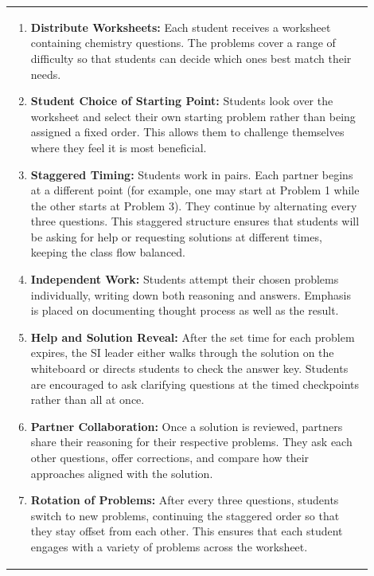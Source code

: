 \documentclass{article}
\begin{document}
\begin{tabular}{|p{0.9\linewidth}|}
\hline
\vspace{0.2cm}
\begin{enumerate}
    \item \textbf{Distribute Worksheets:} Each student receives a worksheet containing chemistry questions. The problems cover a range of difficulty so that students can decide which ones best match their needs.
    
    \item \textbf{Student Choice of Starting Point:} Students look over the worksheet and select their own starting problem rather than being assigned a fixed order. This allows them to challenge themselves where they feel it is most beneficial.
    
    \item \textbf{Staggered Timing:} Students work in pairs. Each partner begins at a different point (for example, one may start at Problem 1 while the other starts at Problem 3). They continue by alternating every three questions. This staggered structure ensures that students will be asking for help or requesting solutions at different times, keeping the class flow balanced.
    
    \item \textbf{Independent Work:} Students attempt their chosen problems individually, writing down both reasoning and answers. Emphasis is placed on documenting thought process as well as the result.
    
    \item \textbf{Help and Solution Reveal:} After the set time for each problem expires, the SI leader either walks through the solution on the whiteboard or directs students to check the answer key. Students are encouraged to ask clarifying questions at the timed checkpoints rather than all at once.
    
    \item \textbf{Partner Collaboration:} Once a solution is reviewed, partners share their reasoning for their respective problems. They ask each other questions, offer corrections, and compare how their approaches aligned with the solution.
    
    \item \textbf{Rotation of Problems:} After every three questions, students switch to new problems, continuing the staggered order so that they stay offset from each other. This ensures that each student engages with a variety of problems across the worksheet.
    

\end{enumerate}
\end{tabular}
\end{document}
